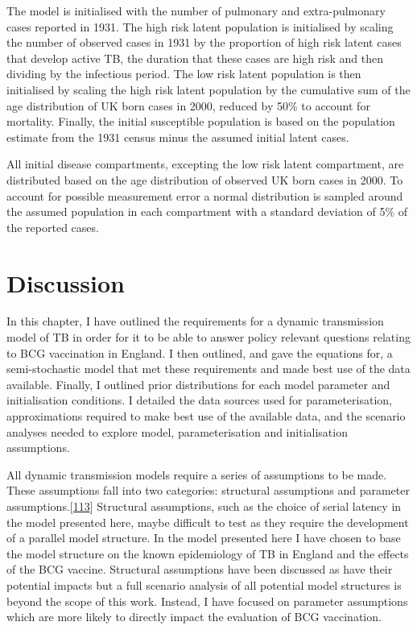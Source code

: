 \documentclass[11pt,twoside]{bristolthesis}
\begin{document}
  The model is initialised with the number of pulmonary and extra-pulmonary cases reported in 1931. The high risk latent population is initialised by scaling the number of observed cases in 1931 by the proportion of high risk latent cases that develop active TB, the duration that these cases are high risk and then dividing by the infectious period. The low risk latent population is then initialised by scaling the high risk latent population by the cumulative sum of the age distribution of UK born cases in 2000, reduced by 50\% to account for mortality. Finally, the initial susceptible population is based on the population estimate from the 1931 census minus the assumed initial latent cases.
  
  All initial disease compartments, excepting the low risk latent compartment, are distributed based on the age distribution of observed UK born cases in 2000. To account for possible measurement error a normal distribution is sampled around the assumed population in each compartment with a standard deviation of 5\% of the reported cases.
  
  \hypertarget{discussion-5}{%
  \section{Discussion}\label{discussion-5}}
  
  In this chapter, I have outlined the requirements for a dynamic transmission model of TB in order for it to be able to answer policy relevant questions relating to BCG vaccination in England. I then outlined, and gave the equations for, a semi-stochastic model that met these requirements and made best use of the data available. Finally, I outlined prior distributions for each model parameter and initialisation conditions. I detailed the data sources used for parameterisation, approximations required to make best use of the available data, and the scenario analyses needed to explore model, parameterisation and initialisation assumptions.
  
  All dynamic transmission models require a series of assumptions to be made. These assumptions fall into two categories: structural assumptions and parameter assumptions.{[}\protect\hyperlink{ref-Dowdy2012}{113}{]} Structural assumptions, such as the choice of serial latency in the model presented here, maybe difficult to test as they require the development of a parallel model structure. In the model presented here I have chosen to base the model structure on the known epidemiology of TB in England and the effects of the BCG vaccine. Structural assumptions have been discussed as have their potential impacts but a full scenario analysis of all potential model structures is beyond the scope of this work. Instead, I have focused on parameter assumptions which are more likely to directly impact the evaluation of BCG vaccination.
  
\end{document}
